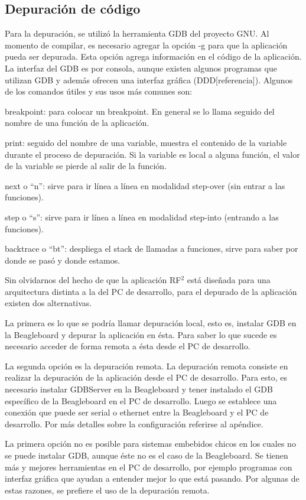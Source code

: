 \subsection{Depuración de código}
Para la depuración, se utilizó la herramienta GDB del proyecto GNU. 
Al momento de compilar, es necesario agregar la opción -g para que la aplicación pueda ser depurada. Esta opción agrega información en el código de la aplicación.
La interfaz del GDB es por consola, aunque existen algunos programas que utilizan GDB y además ofrecen una interfaz gráfica (DDD[referencia]).
Algunos de los comandos útiles y sus usos más comunes son: 

\bigskip
breakpoint: para colocar un breakpoint. En general se lo llama seguido del nombre de una función de la aplicación.

print: seguido del nombre de una variable, muestra el contenido de la variable durante el proceso de depuración. Si la variable es local a alguna función, el valor de la variable se pierde al salir de la función.

next o “n”: sirve para ir línea a línea en modalidad step-over (sin entrar a las funciones).

step o “s”: sirve para ir línea a línea en modalidad step-into (entrando a las funciones).

backtrace o “bt”: despliega el stack de llamadas a funciones, sirve para saber por donde se pasó y donde estamos.

\bigskip
Sin olvidarnos del hecho de que la aplicación RF$^{2}$ está diseñada para una arquitectura distinta a la del PC de desarrollo, para el depurado de la aplicación existen dos alternativas. 

La primera es lo que se podría llamar depuración local, esto es, instalar GDB en la Beagleboard y depurar la aplicación en ésta. Para saber lo que sucede es necesario acceder de forma remota a ésta desde el PC de desarrollo. 

La segunda opción es la depuración remota. La depuración remota consiste en realizar la depuración de la aplicación desde el PC de desarrollo. Para esto, es necesario instalar GDBServer en la Beagleboard y tener instalado el GDB específico de la Beagleboard en el PC de desarrollo. Luego se establece una conexión que puede ser serial o ethernet entre la Beagleboard y el PC de desarrollo. Por más detalles sobre la configuración referirse al apéndice.

\bigskip
La primera opción no es posible para sistemas embebidos chicos en los cuales no se puede instalar GDB, aunque éste no es el caso de la Beagleboard. 
Se tienen más y mejores herramientas en el PC de desarrollo, por ejemplo programas con interfaz gráfica que ayudan a entender mejor lo que está pasando. Por algunas de estas razones, se prefiere el uso de la depuración remota. 

